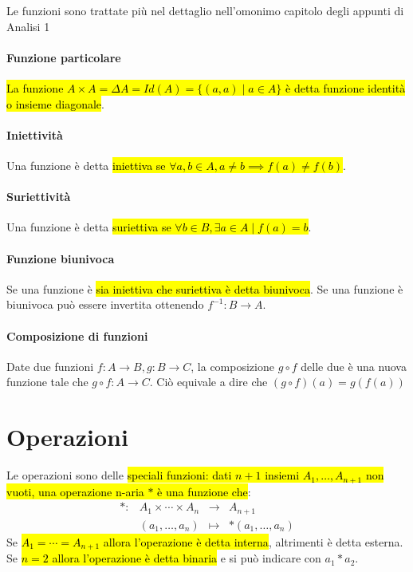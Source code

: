 Le funzioni sono trattate più nel dettaglio nell'omonimo capitolo degli appunti
di Analisi 1

\paragraph{Funzione particolare} \hl{La funzione
$A \times A = \Delta A = Id(A) = \{(a,a) \mid a \in A\}$ è detta funzione identità
o insieme diagonale}.

\paragraph{Iniettività} Una funzione è detta \hl{iniettiva se
$\forall a,b \in A, a \neq b \implies f(a) \neq f(b)$}.

\paragraph{Suriettività} Una funzione è detta \hl{suriettiva se
$\forall b \in B, \exists a \in A \mid f(a) = b$}.

\paragraph{Funzione biunivoca} Se una funzione è \hl{sia iniettiva che
suriettiva è detta biunivoca}. Se una funzione è biunivoca può essere invertita
ottenendo $f^{-1}: B \to A$.

\paragraph{Composizione di funzioni} Date due funzioni $f: A \to B, g: B \to C$,
la composizione $g \circ f$ delle due è una nuova funzione tale che
$g \circ f: A \to C$. Ciò equivale a dire che $(g \circ f)(a) = g(f(a))$

\section{Operazioni}
Le operazioni sono delle \hl{speciali funzioni: dati $n+1$ insiemi
$A_1, \dots, A_{n+1}$ non vuoti, una operazione n-aria $\ast$ è una funzione
che}:\[
    \begin{array}{cccc}
        \ast: &A_1 \times \cdots \times A_{n} &\to &A_{n+1} \\
        &(a_1, \dots, a_n) &\mapsto & \ast (a_1, \dots, a_n)
    \end{array}
\]
Se \hl{$A_1 = \cdots = A_{n+1}$ allora l'operazione è detta interna}, altrimenti
è detta esterna. Se \hl{$n = 2$ allora l'operazione è detta binaria} e si può
indicare con $a_1 \ast a_2$.

